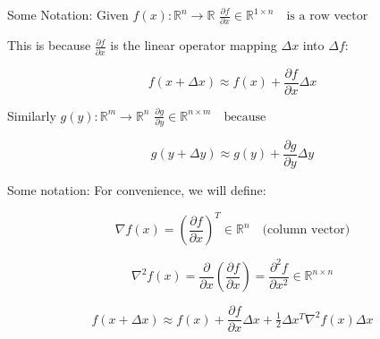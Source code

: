 \begin{frame}{Some Notation:}
Given $f(x): \mathbb{R}^n \to \mathbb{R}$ \quad \quad \quad \quad \quad \quad \quad \quad $\frac{\partial f}{\partial x} \in \mathbb{R}^{1 \times n} \quad \text{is a row vector}$

This is because $\frac{\partial f}{\partial x}$ is the linear operator mapping $\Delta x$ into $\Delta f$:

$$
f(x + \Delta x) \approx f(x) + \frac{\partial f}{\partial x}\Delta x
$$

Similarly $g(y): \mathbb{R}^m \to \mathbb{R}^n$ \quad \quad \quad \quad \quad $\frac{\partial g}{\partial y} \in \mathbb{R}^{n \times m} \quad \text{because}$

$$
g(y+\Delta y) \approx g(y) + \frac{\partial g}{\partial y}\Delta y
$$
\end{frame}

\begin{frame}{Some notation:}
For convenience, we will define:

$$
\nabla f(x) = \left(\frac{\partial f}{\partial x}\right)^T \in \mathbb{R}^n \quad \text{(column vector)}
$$

$$
\nabla^2 f(x) = \frac{\partial}{\partial x}\left(\frac{\partial f}{\partial x}\right) = \frac{\partial^2 f}{\partial x^2} \in \mathbb{R}^{n \times n}
$$

$$
f(x+\Delta x) \approx f(x) + \frac{\partial f}{\partial x}\Delta x + \tfrac{1}{2}\Delta x^T \nabla^2 f(x)\Delta x
$$
    
\end{frame}

